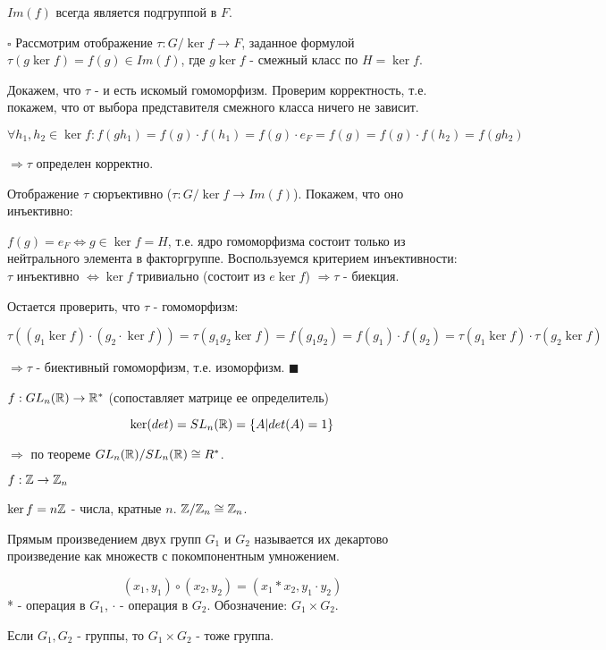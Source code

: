 \documentclass[../main.tex]{subfiles}
\begin{document}
\void{} $Im(f)$ всегда является подгруппой в $F$.

\void
$\square$ Рассмотрим отображение $\tau: G/\ker{f}\rightarrow F$, заданное формулой
$\tau(g\ker{f}) = f(g)\in Im(f)$, где $g\ker{f}$ - смежный класс по $H = \ker{f}$.

Докажем, что $\tau$ - и есть искомый гомоморфизм. Проверим корректность, т.е. покажем,
что от выбора представителя смежного класса ничего не зависит.

$$\forall h_1,h_2\in \ker{f}: f(gh_1) = f(g)\cdot f(h_1) = f(g)\cdot e_F = f(g) = 
f(g)\cdot f(h_2) = f(gh_2)$$

$\Rightarrow \tau$ определен корректно.

Отображение $\tau$ сюръективно ($\tau: G/\ker{f}\rightarrow Im(f)$). Покажем,
что оно инъективно:

$f(g) = e_F \Longleftrightarrow g\in \ker{f} = H$, т.е. ядро гомоморфизма состоит только из
нейтрального элемента в факторгруппе. Воспользуемся критерием инъективности: $\tau$
инъективно $\Longleftrightarrow \ker{f}$ тривиально (состоит из $e\ker{f}$) $\Longrightarrow \tau$
- биекция.

Остается проверить, что $\tau$ - гомоморфизм:

$$\tau((g_1\ker{f})\cdot (g_2\cdot\ker{f})) = \tau(g_1g_2\ker{f}) = f(g_1g_2) = f(g_1)\cdot f(g_2)
= \tau(g_1\ker{f})\cdot \tau(g_2\ker{f})$$

$\Longrightarrow \tau$ - биективный гомоморфизм, т.е. изоморфизм. $\blacksquare$

\void
{}

\void{} $f: GL_n(\mathbb{R}) \rightarrow \mathbb{R}^*$ (сопоставляет матрице ее определитель)

$$\ker(det) = SL_n(\mathbb{R}) = \{A\vert det(A) = 1\}$$

$\Rightarrow$ по теореме $GL_n(\mathbb{R})/SL_n(\mathbb{R}) \cong R^*$.

\void{} $f: \mathbb{Z} \rightarrow \mathbb{Z}_n$

$\ker{f} = n\mathbb{Z}$ - числа, кратные $n$. $\mathbb{Z}/\mathbb{Z}_n \cong \mathbb{Z}_n$.

\void
{} Прямым произведением двух групп $G_1$ и $G_2$ называется их декартово
произведение как множеств с покомпонентным умножением.

$$(x_1, y_1) \circ (x_2, y_2) = (x_1 * x_2, y_1 \cdot y_2)$$
* - операция в $G_1$, $\cdot$ - операция в $G_2$.
Обозначение: $G_1\times G_2$.

\void
{} Если $G_1, G_2$ - группы, то $G_1\times G_2$ - тоже группа.
\end{document}
